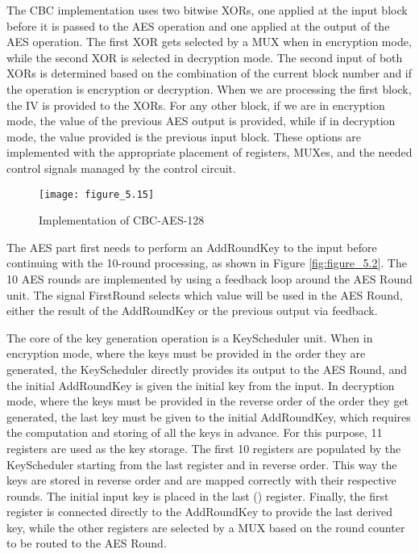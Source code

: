 The CBC implementation uses two bitwise XORs, one applied at the input block before it is passed to the AES operation and one applied at the output of the AES operation. The first XOR gets selected by a MUX when in encryption mode, while the second XOR is selected in decryption mode. The second input of both XORs is determined based on the combination of the current block number and if the operation is encryption or decryption. When we are processing the first block, the IV is provided to the XORs. For any other block, if we are in encryption mode, the value of the previous AES output is provided, while if in decryption mode, the value provided is the previous input block. These options are implemented with the appropriate placement of registers, MUXes, and the needed control signals managed by the control circuit.

\begin{figure}
\centering
\texttt{[image: figure\_5.15]}\\
\caption{ Implementation of CBC-AES-128 }
\label{fig:figure_5.15}
\end{figure}


The AES part first needs to perform an AddRoundKey to the input before continuing with the 10-round processing, as shown in Figure \ref{fig:figure_5.2}. The 10 AES rounds are implemented by using a feedback loop around the AES Round unit. The signal FirstRound selects which value will be used in the AES Round, either the result of the AddRoundKey or the previous output via feedback.

The core of the key generation operation is a KeyScheduler unit. When in encryption mode, where the keys must be provided in the order they are generated, the KeyScheduler directly provides its output to the AES Round, and the initial AddRoundKey is given the initial key from the input. In decryption mode, where the keys must be provided in the reverse order of the order they get generated, the last key must be given to the initial AddRoundKey, which requires the computation and storing of all the keys in advance. For this purpose, 11 registers are used as the key storage. The first 10 registers are populated by the KeyScheduler starting from the last register and in reverse order. This way the keys are stored in reverse order and are mapped correctly with their respective rounds. The initial input key is placed in the last () register. Finally, the first register is connected directly to the AddRoundKey to provide the last derived key, while the other registers are selected by a MUX based on the round counter to be routed to the AES Round.


